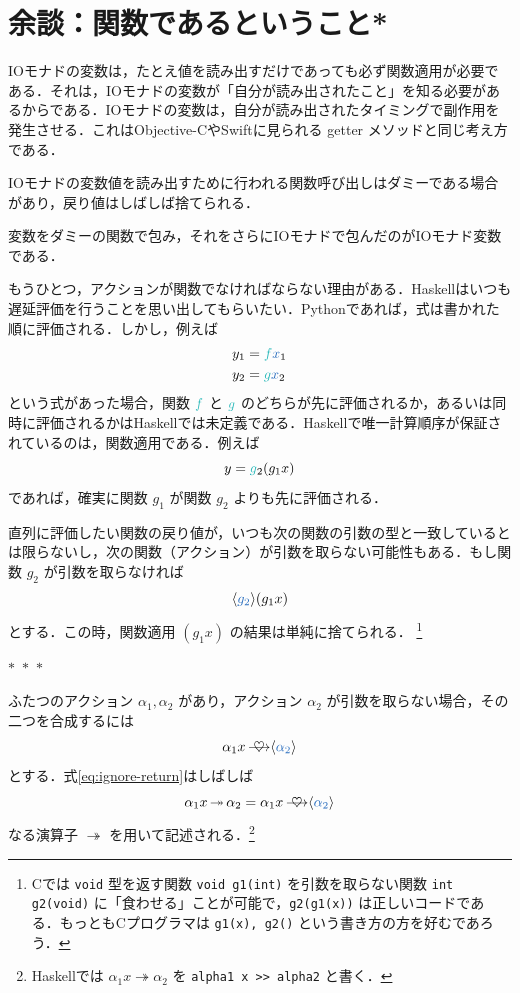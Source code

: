 \documentclass[a5paper,twoside,fleqn,draft]{jsbook}
\def\varColor{NavyBlue}
\def\funcColor{BlueGreen}
\newcommand{\separator}{\begin{center}$*$~$*$~$*$\end{center}}
\newcommand{\programminglanguage}[1]{\textsf{#1}}
\newcommand{\clang}{\programminglanguage{C}}
\newcommand{\haskell}{\programminglanguage{Haskell}}
\newcommand{\objectivec}{\programminglanguage{Objective-C}}
\newcommand{\python}{\programminglanguage{Python}}
\newcommand{\swift}{\programminglanguage{Swift}}
\newcommand{\code}[1]{\texttt{#1}}
\newcommand{\mVar}[1]{\textcolor{\varColor}{#1}}
\newcommand{\mXVar}{\mVar{x}}
\newcommand{\mFunc}[1]{\textcolor{\funcColor}{#1}}
\newcommand{\mFFunc}{{\mFunc{f}}}
\newcommand{\mGFunc}{\mFunc{g}}
\DeclareMathOperator{\mBind}{\heartsuit}
\DeclareMathOperator{\mBindRight}{\ooalign{$\longrightarrow$\crcr\hss$\mBind$\hss}}
\DeclareMathOperator{\mBindRightIgnore}{\twoheadrightarrow}
\newcommand{\mConstWith}[1]{\langle\mVar{#1}\rangle}
\begin{document}
\section{余談：関数であるということ*}

IOモナドの変数は，たとえ値を読み出すだけであっても必ず関数適用が必要である．それは，IOモナドの変数が「自分が読み出されたこと」を知る必要があるからである．IOモナドの変数は，自分が読み出されたタイミングで副作用を発生させる．これは\objectivec や\swift に見られる getter メソッドと同じ考え方である．

IOモナドの変数値を読み出すために行われる関数呼び出しはダミーである場合があり，戻り値はしばしば捨てられる．

変数をダミーの関数で包み，それをさらにIOモナドで包んだのがIOモナド変数である．

もうひとつ，アクションが関数でなければならない理由がある．\haskell はいつも遅延評価を行うことを思い出してもらいたい．\python であれば，式は書かれた順に評価される．しかし，例えば
\begin{align}
y_1&=\mFFunc \mXVar_1\\
y_2&=\mGFunc \mXVar_2
\end{align}
という式があった場合，関数 $\mFFunc$ と $\mGFunc$ のどちらが先に評価されるか，あるいは同時に評価されるかは\haskell では未定義である．\haskell で唯一計算順序が保証されているのは，関数適用である．例えば
\begin{equation}
y=\mGFunc_2(g_1x)
\end{equation}
であれば，確実に関数 $g_1$ が関数 $g_2$ よりも先に評価される．

直列に評価したい関数の戻り値が，いつも次の関数の引数の型と一致しているとは限らないし，次の関数（アクション）が引数を取らない可能性もある．もし関数 $g_2$ が引数を取らなければ
\begin{equation}
\mConstWith{g_2}(g_1x)
\end{equation}
とする．この時，関数適用 $(g_1x)$ の結果は単純に捨てられる．
\footnote{\clang では \code{void} 型を返す関数 \code{void g1(int)} を引数を取らない関数 \code{int g2(void)} に「食わせる」ことが可能で，\code{g2(g1(x))} は正しいコードである．もっとも\clang プログラマは \code{g1(x), g2()} という書き方の方を好むであろう．}

\separator

ふたつのアクション $\alpha_1,\alpha_2$ があり，アクション $\alpha_2$ が引数を取らない場合，その二つを合成するには
\begin{equation}
\label{eq:ignore-return}
\alpha_1 x\mBindRight\mConstWith{\alpha_2}
\end{equation}
とする．式\eqref{eq:ignore-return}はしばしば
\begin{equation}
\alpha_1 x\mBindRightIgnore\alpha_2=\alpha_1x\mBindRight\mConstWith{\alpha_2}
\end{equation}
なる演算子 $\mBindRightIgnore$ を用いて記述される．\footnote{\haskell では $\alpha_1x\mBindRightIgnore\alpha_2$ を \code{alpha1 x >> alpha2} と書く．}
\end{document}
